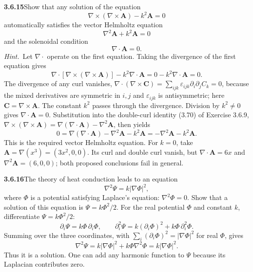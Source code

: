 \par\bigskip
\noindent\textbf{3.6.15}\quad Show that any solution of the equation
\[
\nabla\times(\nabla\times\mathbf{A})-k^{2}\mathbf{A}=0
\]
automatically satisfies the vector Helmholtz equation
\[
\nabla^{2}\mathbf{A}+k^{2}\mathbf{A}=0
\]
and the solenoidal condition
\[
\nabla\cdot\mathbf{A}=0.
\]
\emph{Hint.}~Let $\nabla\cdot$ operate on the first equation.
\solution
{}
Taking the divergence of the first equation gives
\[
\nabla\cdot[\nabla\times(\nabla\times\mathbf A)]-k^2\nabla\cdot\mathbf A
=0-k^2\nabla\cdot\mathbf A=0.
\]
The divergence of any curl vanishes,
$\nabla\cdot(\nabla\times\mathbf C)
=\sum_{ijk}\varepsilon_{ijk}\partial_i\partial_jC_k=0$, because the mixed
derivatives are symmetric in $i,j$ and $\varepsilon_{ijk}$ is antisymmetric;
here $\mathbf C=\nabla\times\mathbf A$. The constant $k^2$ passes through
the divergence. Division by $k^2\ne0$ gives $\nabla\cdot\mathbf A=0$.
Substitution into the double-curl identity (3.70) of Exercise 3.6.9,
$\nabla\times(\nabla\times\mathbf A)
=\nabla(\nabla\cdot\mathbf A)-\nabla^2\mathbf A$, then yields
\[
0=\nabla(\nabla\cdot\mathbf A)-\nabla^2\mathbf A-k^2\mathbf A
=-\nabla^2\mathbf A-k^2\mathbf A.
\]
This is the required vector Helmholtz equation.
For $k=0$, take $\mathbf A=\nabla(x^3)=(3x^2,0,0)$.
Its curl and double curl vanish, but
$\nabla\cdot\mathbf A=6x$ and $\nabla^2\mathbf A=(6,0,0)$;
both proposed conclusions fail in general.

\par\bigskip
\noindent\textbf{3.6.16}\quad The theory of heat conduction leads to an
equation
\[
\nabla^{2}\Psi=k\left|\nabla\Phi\right|^{2},
\]
where $\Phi$ is a potential satisfying Laplace's equation: $\nabla^{2}\Phi=0$.
Show that a solution of this equation is $\Psi=k\Phi^{2}/2$.
\solution
For the real potential $\Phi$ and constant $k$, differentiate
$\Psi=k\Phi^2/2$:
\[
\partial_i\Psi=k\Phi\,\partial_i\Phi,\qquad
\partial_i^2\Psi=k(\partial_i\Phi)^2+k\Phi\,\partial_i^2\Phi.
\]
Summing over the three coordinates, with
$\sum_i(\partial_i\Phi)^2=|\nabla\Phi|^2$ for real $\Phi$, gives
\[
\nabla^2\Psi=k|\nabla\Phi|^2+k\Phi\nabla^2\Phi
=\boxed{k|\nabla\Phi|^2}.
\]
Thus it is a solution. One can add any harmonic function to $\Psi$
because its Laplacian contributes zero.

